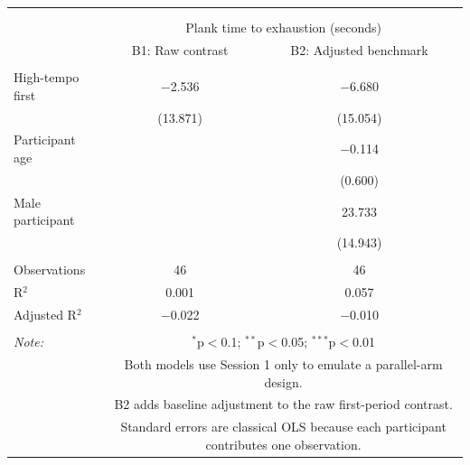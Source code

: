 
\begingroup 
\scriptsize 
\begin{tabular}{@{\extracolsep{3pt}}lcc} 
\\[-1.8ex]\hline 
\hline \\[-1.8ex] 
\\[-1.8ex] & \multicolumn{2}{c}{Plank time to exhaustion (seconds)} \\ 
 & B1: Raw contrast & B2: Adjusted benchmark \\ 
\hline \\[-1.8ex] 
 High-tempo first & $-$2.536 & $-$6.680 \\ 
  & (13.871) & (15.054) \\ 
  Participant age &  & $-$0.114 \\ 
  &  & (0.600) \\ 
  Male participant &  & 23.733 \\ 
  &  & (14.943) \\ 
 \hline \\[-1.8ex] 
Observations & 46 & 46 \\ 
R$^{2}$ & 0.001 & 0.057 \\ 
Adjusted R$^{2}$ & $-$0.022 & $-$0.010 \\ 
\hline 
\hline \\[-1.8ex] 
\textit{Note:}  & \multicolumn{2}{p{0.82\textwidth}}{$^{*}$p$<$0.1; $^{**}$p$<$0.05; $^{***}$p$<$0.01} \\ 
 & \multicolumn{2}{p{0.82\textwidth}}{Both models use Session 1 only to emulate a parallel-arm design.} \\ 
 & \multicolumn{2}{p{0.82\textwidth}}{B2 adds baseline adjustment to the raw first-period contrast.} \\ 
 & \multicolumn{2}{p{0.82\textwidth}}{Standard errors are classical OLS because each participant contributes one observation.} \\ 
\end{tabular} 
\endgroup 
